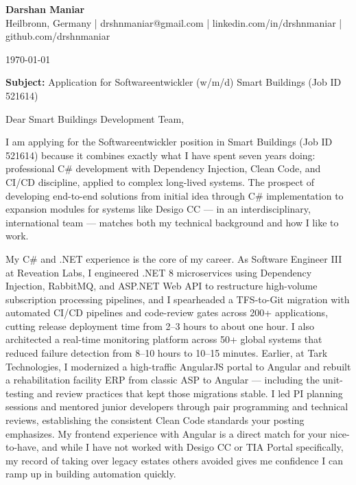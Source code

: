 \documentclass[letterpaper,11pt]{article}
\begin{document}
\begin{center}
{\Large \bfseries Darshan Maniar} \\ \vspace{2pt}
{\small Heilbronn, Germany | drshnmaniar@gmail.com | linkedin.com/in/drshnmaniar | github.com/drshnmaniar}
\end{center}
\begin{flushright}
{\small \today}
\end{flushright}


{\small \textbf{Subject:} Application for Softwareentwickler (w/m/d) Smart Buildings (Job ID 521614)}


{\small Dear Smart Buildings Development Team,}


{\small I am applying for the Softwareentwickler position in Smart Buildings (Job ID 521614) because it combines exactly what I have spent seven years doing: professional C\# development with Dependency Injection, Clean Code, and CI/CD discipline, applied to complex long-lived systems. The prospect of developing end-to-end solutions from initial idea through C\# implementation to expansion modules for systems like Desigo CC — in an interdisciplinary, international team — matches both my technical background and how I like to work.}


{\small My C\# and .NET experience is the core of my career. As Software Engineer III at Reveation Labs, I engineered .NET 8 microservices using Dependency Injection, RabbitMQ, and ASP.NET Web API to restructure high-volume subscription processing pipelines, and I spearheaded a TFS-to-Git migration with automated CI/CD pipelines and code-review gates across 200+ applications, cutting release deployment time from 2–3 hours to about one hour. I also architected a real-time monitoring platform across 50+ global systems that reduced failure detection from 8–10 hours to 10–15 minutes. Earlier, at Tark Technologies, I modernized a high-traffic AngularJS portal to Angular and rebuilt a rehabilitation facility ERP from classic ASP to Angular — including the unit-testing and review practices that kept those migrations stable. I led PI planning sessions and mentored junior developers through pair programming and technical reviews, establishing the consistent Clean Code standards your posting emphasizes. My frontend experience with Angular is a direct match for your nice-to-have, and while I have not worked with Desigo CC or TIA Portal specifically, my record of taking over legacy estates others avoided gives me confidence I can ramp up in building automation quickly.}
\end{document}
